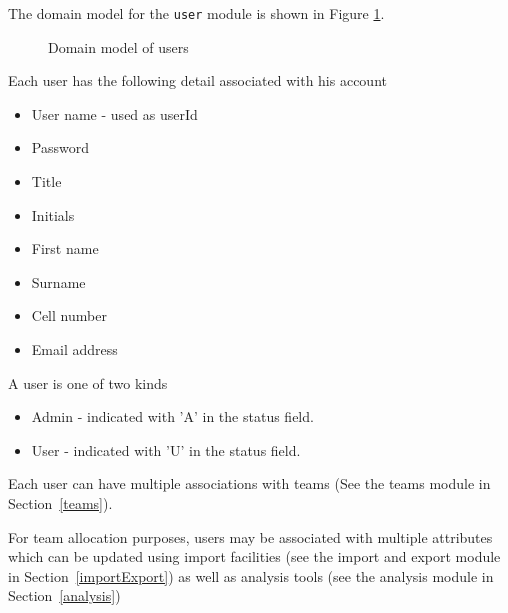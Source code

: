 The domain model for the \texttt{user} module is shown in Figure \ref{fig:users_domainModel}.

\begin{figure}[htb]
\begin{center}
\end{center}
\caption{ \label{fig:users_domainModel} Domain model of users}
\end{figure}

Each user has the following detail associated with his account
\begin{itemize}

\item User name - used as userId
\item Password
\item Title
\item Initials
\item First name
\item Surname
\item Cell number
\item Email address
\end{itemize}

A user is one of two kinds
\begin{itemize}
\item  Admin - indicated with 'A' in the status field.
\item User - indicated with 'U' in the status field.
\end{itemize}

Each user can have multiple associations with teams (See the teams module in Section~\ref{teams}).  

For team allocation purposes, users may be associated with multiple attributes which can be updated using import facilities (see the import and export module in Section~\ref{importExport}) as well as analysis tools (see the analysis module in Section~\ref{analysis})  